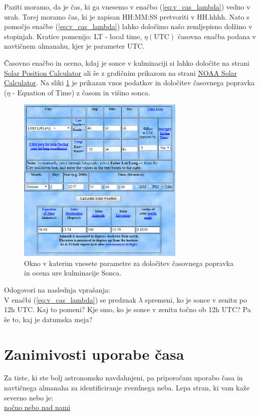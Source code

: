 \documentclass[11pt]{article}
\begin{document}
Paziti moramo, da je čas, ki ga vnesemo v enačbo (\ref{eq:v_cas_lambda}) vedno v urah. Torej moramo čas, ki je zapisan HH:MM:SS pretvoriti v HH.hhhh. Nato s pomočjo enačbe (\ref{eq:v_cas_lambda}) lahko določimo našo zemljepisno dolžino v stopinjah. Kratice pomenijo: LT - local time, $\eta(\text{UTC})$ časovna enačba podana v navtičnem almanahu, kjer je parameter UTC.

Časovno enačbo in oceno, kdaj je sonce v kulminaciji si lahko določite na strani \href{https://www.esrl.noaa.gov/gmd/grad/solcalc/azel.html}{Solar Position Calculator} ali še z grafičnim prikazom na strani \href{https://www.esrl.noaa.gov/gmd/grad/solcalc/}{NOAA Solar Calculator}. Na sliki \ref{fig:v_cas_calculator} je prikazan vnos podatkov in določitev časovnega popravka ($\eta$ - Equation of Time) z časom in višino sonca.
%
\begin{figure}[tbph!]
	\centering \includegraphics[width=8cm]{figs/calculator.png}
	\caption{Okno v katerim vnesete parametre za določitev časovnega popravka in ocena ure kulminacije Sonca.}
	\label{fig:v_cas_calculator}
\end{figure}

%
Odogovori na naslednja vprašanja:\\[2mm]
V enačbi (\ref{eq:v_cas_lambda}) se predznak $\lambda$ spremeni, ko je sonce v zenitu po 12h UTC. Kaj to pomeni? Kje smo, ko je sonce v zenitu točno ob 12h UTC? Pa še to, kaj je datumska meja?

\pagebreak
\section{Zanimivosti uporabe časa}
Za tiste, ki ste bolj astronomsko navdahnjeni, pa priporočam uporabo časa in navtičnega almanaha za identificiranje zvezdnega neba. Lepa stran, ki vam kaže severno nebo je:\\[2mm]
%
\href{http://www.jodcast.net/sky}{nočno nebo nad nami}
%
\end{document}
